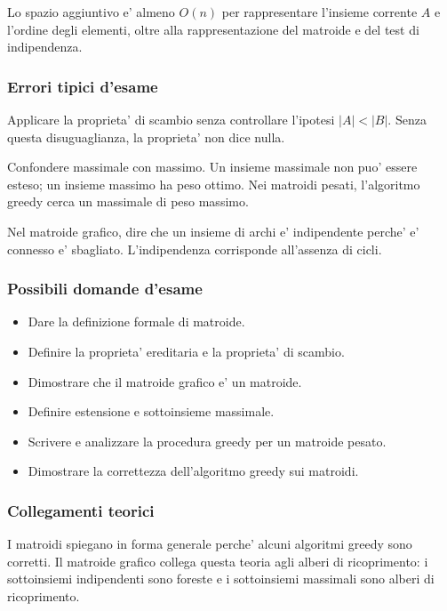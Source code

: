 Lo spazio aggiuntivo e' almeno $O(n)$ per rappresentare l'insieme corrente $A$ e l'ordine degli elementi, oltre alla rappresentazione del matroide e del test di indipendenza.

\subsubsection{Errori tipici d'esame}
\begin{hardnote}
Applicare la proprieta' di scambio senza controllare l'ipotesi $|A|<|B|$. Senza questa disuguaglianza, la proprieta' non dice nulla.
\end{hardnote}

\begin{hardnote}
Confondere massimale con massimo. Un insieme massimale non puo' essere esteso; un insieme massimo ha peso ottimo. Nei matroidi pesati, l'algoritmo greedy cerca un massimale di peso massimo.
\end{hardnote}

\begin{hardnote}
Nel matroide grafico, dire che un insieme di archi e' indipendente perche' e' connesso e' sbagliato. L'indipendenza corrisponde all'assenza di cicli.
\end{hardnote}

\subsubsection{Possibili domande d'esame}
\begin{itemize}
	\item Dare la definizione formale di matroide.
	\item Definire la proprieta' ereditaria e la proprieta' di scambio.
	\item Dimostrare che il matroide grafico e' un matroide.
	\item Definire estensione e sottoinsieme massimale.
	\item Scrivere e analizzare la procedura greedy per un matroide pesato.
	\item Dimostrare la correttezza dell'algoritmo greedy sui matroidi.
\end{itemize}

\subsubsection{Collegamenti teorici}
I matroidi spiegano in forma generale perche' alcuni algoritmi greedy sono corretti. Il matroide grafico collega questa teoria agli alberi di ricoprimento: i sottoinsiemi indipendenti sono foreste e i sottoinsiemi massimali sono alberi di ricoprimento.

